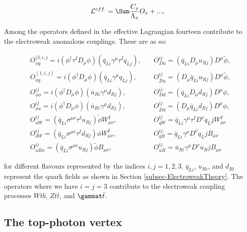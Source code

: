 \begin{equation} \label{eqn-EffectiveOperators}
\lumi^{eff.} = \Sum \frac{C_x}{\Lambda_x}O_x + ... ,
\end{equation}

Among the operators defined in the effective Lagrangian \cite{Buchmuller:1985jz} fourteen contribute to the electroweak anomalous couplings. These are as so:

\begin{align}
& O^{(3, i, j}_{\phi q} = i(\phi^{\dagger}\tau^I D_{\mu} \phi)(\bar{q}_{Li}\gamma^{\mu}\tau^I q_{Lj}), \quad & O^{ij}_{Du} = (\bar{q}_{Li} D_{\mu} u_{Rj}) D^{\mu} \tilde{\phi}, \\
& O^{(1, i, j)}_{\phi q} = i(\phi^{\dagger} D_{\mu} \phi)(\bar{q}_{Li}\gamma^{\mu} q_{Lj}), \quad & O^{ij}_{\bar{D}u} = (D_{\mu} \bar{q}_{Li} u_{Rj}) D^{\mu} \tilde{\phi}, \\
& O^{ij}_{\phi \phi} = i(\phi^{\dagger} D_{\mu} \phi)(\bar{u}_{Ri}\gamma^{\mu} d_{Rj}), \quad & O^{ij}_{Dd} = (\bar{q}_{Li} D_{\mu} d_{Rj}) D^{\mu} \phi, \\
& O^{ij}_{\phi u} = i(\phi^{\dagger} D_{\mu} \phi)(\bar{u}_{Ri}\gamma^{\mu} d_{Rj}), \quad & O^{ij}_{\bar{D}d} = (D_{\mu} \bar{q}_{Li} d_{Rj}) D^{\mu} \phi, \\
& O^{ij}_{uW} = (\bar{q}_{Li} \sigma^{\mu \nu} \tau^I u_{Rj})\tilde{\phi} W^I_{\mu \nu}, \quad & O^{ij}_{qW} = \bar{q}_{Li} \gamma^{\mu} \tau^I D^{\nu} q_Lj W^I_{\mu \nu}\\
& O^{ij}_{dW} = (\bar{q}_{Li} \sigma^{\mu \nu} \tau^I d_{Rj})\phi W^I_{\mu \nu}, \quad & O^{ij}_{qB} = \bar{q}_{Li} \gamma^{\mu} D^{\nu} q_Lj B_{\mu \nu}\\
& O^{ij}_{uB\phi} = (\bar{q}_{Li} \sigma^{\mu \nu} u_{Rj})\tilde{\phi} B_{\mu \nu}, \quad & O^{ij}_{uB} = \bar{u}_{Ri} \gamma^{\mu} D^{\nu} u_Rj B_{\mu \nu}
\end{align}

for different flavours represented by the indices $i,j = 1,2,3$. $\bar{q}_{Li}$, $u_{Ri}$, and $d_{Ri}$ represent the quark fields as shown in Section \ref{subsec-ElectroweakTheory}. The operators where we have $i = j = 3$ contribute to the electroweak coupling processes $Wtb$, $Zt\bar{t}$, and $\gammat\bar{t}$. 


\subsection{The top-photon vertex}

